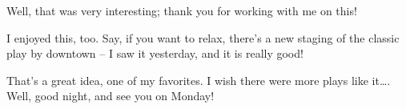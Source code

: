 \heroSTUDENT{} Well, that was very interesting; thank you for working with me
on this!

\heroADVISOR{} I enjoyed this, too. Say, if you want to relax, there's a new
staging of the classic play by \citet{fischer2010play} downtown -- I saw
it yesterday, and it is really good!

\heroSTUDENT{} That's a great idea, one of my favorites. I wish there were
more plays like it\ldots{}. Well, good night, and see you on Monday!
